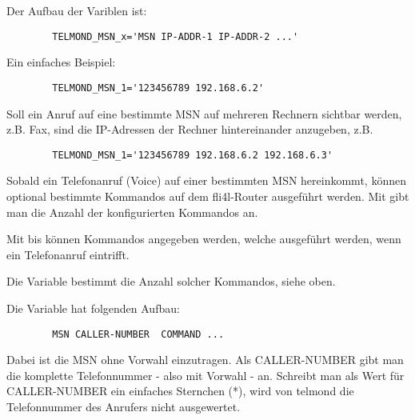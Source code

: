 \begin{description}
  Der Aufbau der Variblen ist:
\begin{example}
\begin{verbatim}
        TELMOND_MSN_x='MSN IP-ADDR-1 IP-ADDR-2 ...'
\end{verbatim}
\end{example}

  
  Ein einfaches Beispiel:

\begin{example}
\begin{verbatim}
        TELMOND_MSN_1='123456789 192.168.6.2'            
\end{verbatim}
\end{example}

  
  Soll ein Anruf auf eine bestimmte MSN auf mehreren Rechnern sichtbar
  werden, z.B. Fax, sind die IP-Adressen der Rechner hintereinander
  anzugeben, z.B.

\begin{example}
\begin{verbatim}
        TELMOND_MSN_1='123456789 192.168.6.2 192.168.6.3'            
\end{verbatim}
\end{example}

  
  Sobald ein Telefonanruf (Voice) auf einer bestimmten MSN
  hereinkommt, können optional bestimmte Kommandos auf dem
  fli4l-Router ausgeführt werden. Mit  gibt man die
  Anzahl der konfigurierten Kommandos an.


  
  Mit  bis  können Kommandos angegeben
  werden, welche ausgeführt werden, wenn ein Telefonanruf
  eintrifft.
  
  Die Variable  bestimmt die Anzahl solcher Kommandos,
  siehe oben.
  
  Die Variable hat folgenden Aufbau:

\begin{example}
\begin{verbatim}
        MSN CALLER-NUMBER  COMMAND ...
\end{verbatim}
\end{example}
  
  Dabei ist die MSN ohne Vorwahl einzutragen. Als CALLER-NUMBER gibt
  man die komplette Telefonnummer - also mit Vorwahl - an. Schreibt
  man als Wert für CALLER-NUMBER ein einfaches Sternchen (*), wird von
  telmond die Telefonnummer des Anrufers nicht ausgewertet.
  

\end{description}
